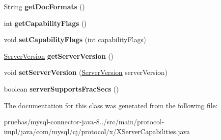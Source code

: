 \begin{DoxyCompactItemize}
String {\bfseries get\+Doc\+Formats} ()
\item 
\mbox{\label{classcom_1_1mysql_1_1cj_1_1protocol_1_1x_1_1_x_server_capabilities_a93c9f2ed36328b3ba55670f27d16d4f7}} 
int {\bfseries get\+Capability\+Flags} ()
\item 
\mbox{\label{classcom_1_1mysql_1_1cj_1_1protocol_1_1x_1_1_x_server_capabilities_af05db5189b56c0a947fe82332ba6e328}} 
void {\bfseries set\+Capability\+Flags} (int capability\+Flags)
\item 
\mbox{\label{classcom_1_1mysql_1_1cj_1_1protocol_1_1x_1_1_x_server_capabilities_a05220b3f1dcfa896701c99b8f3d400c9}} 
\mbox{\hyperlink{classcom_1_1mysql_1_1cj_1_1_server_version}{Server\+Version}} {\bfseries get\+Server\+Version} ()
\item 
\mbox{\label{classcom_1_1mysql_1_1cj_1_1protocol_1_1x_1_1_x_server_capabilities_a352b240088439d6dff829d1f0a879d96}} 
void {\bfseries set\+Server\+Version} (\mbox{\hyperlink{classcom_1_1mysql_1_1cj_1_1_server_version}{Server\+Version}} server\+Version)
\item 
\mbox{\label{classcom_1_1mysql_1_1cj_1_1protocol_1_1x_1_1_x_server_capabilities_a4b4c77a7eb2c156a57797a2b810be4e7}} 
boolean {\bfseries server\+Supports\+Frac\+Secs} ()
\end{DoxyCompactItemize}


The documentation for this class was generated from the following file\+:\begin{DoxyCompactItemize}
\item 
pruebas/mysql-\/connector-\/java-\/8../src/main/protocol-\/impl/java/com/mysql/cj/protocol/x/X\+Server\+Capabilities.\+java\end{DoxyCompactItemize}
